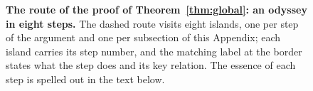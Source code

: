 \documentclass[prx,twocolumn,superscriptaddress,aps,10pt, frontmatterverbose, reprint,footinbib,longbibliography=true]{revtex4-2}
\begin{document}
\begin{figure}[ht!]
\caption{\textbf{The route of the proof of Theorem~\ref{thm:global}: an odyssey in eight steps.} The dashed route visits eight islands, one per step of the argument and one per subsection of this Appendix; each island carries its step number, and the matching label at the border states what the step does and its key relation. The essence of each step is spelled out in the text below.}
\label{fig:odyssey}
\end{figure}
\end{document}
